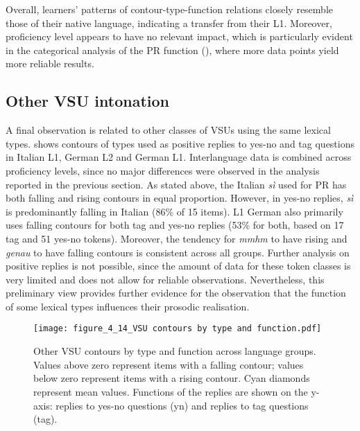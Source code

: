 Overall, learners’ patterns of contour-type-function relations closely resemble those of their native language, indicating a transfer from their L1. Moreover, proficiency level appears to have no relevant impact, which is particularly evident in the categorical analysis of the PR function (), where more data points yield more reliable results.

\subsection{Other VSU intonation}
\label{sec:4.}
A final observation is related to other classes of VSUs using the same lexical types.  shows contours of types used as positive replies to yes-no and tag questions in Italian L1, German L2 and German L1. Interlanguage data is combined across proficiency levels, since no major differences were observed in the analysis reported in the previous section. As stated above, the Italian \textit{sì} used for PR has both falling and rising contours in equal proportion. However, in yes-no replies, \textit{sì} is predominantly falling in Italian (86\% of 15 items). L1 German also primarily uses falling contours for both tag and yes-no replies (53\% for both, based on 17 tag and 51 yes-no tokens). Moreover, the tendency for \textit{mmhm} to have rising and \textit{genau} to have falling contours is consistent across all groups. Further analysis on positive replies is not possible, since the amount of data for these token classes is very limited and does not allow for reliable observations. Nevertheless, this preliminary view provides further evidence for the observation that the function of some lexical types influences their prosodic realisation.

\begin{figure}
\texttt{[image: figure\_4\_14\_VSU contours by type and function.pdf]}
\caption{Other VSU contours by type and function across language groups. Values above zero represent items with a falling contour; values below zero represent items with a rising contour. Cyan diamonds represent mean values. Functions of the replies are shown on the y-axis: replies to yes-no questions (yn) and replies to tag questions (tag).}
\label{fig:4.14}
\end{figure}

